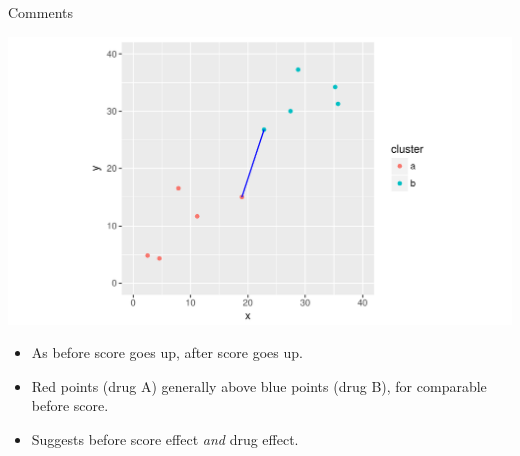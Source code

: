 \begin{frame}[fragile]{Comments}

\begin{knitrout}
\color{fgcolor}\begin{kframe}
\begin{alltt}
\end{alltt}
\end{kframe}
\includegraphics[width=\maxwidth]{figure/unnamed-chunk-3-1} 

\end{knitrout}

\begin{itemize}
\item As before score goes up, after score goes up.
\item Red points (drug A) generally above blue points (drug B), for
  comparable before score.
\item Suggests before score effect \emph{and} drug effect.
\end{itemize}
  
\end{frame}


